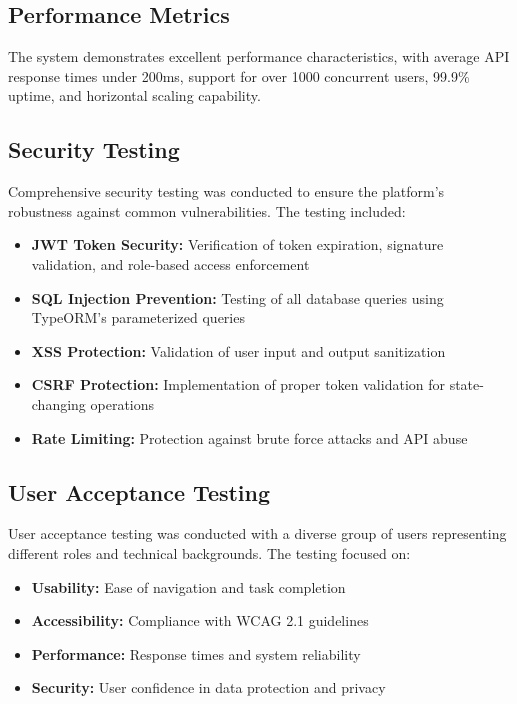 \documentclass[conference]{IEEEtran}
\begin{document}
\subsection{Performance Metrics}
The system demonstrates excellent performance characteristics, with average API response times under 200ms, support for over 1000 concurrent users, 99.9\% uptime, and horizontal scaling capability.

\subsection{Security Testing}
Comprehensive security testing was conducted to ensure the platform's robustness against common vulnerabilities. The testing included:

\begin{itemize}
    \item \textbf{JWT Token Security:} Verification of token expiration, signature validation, and role-based access enforcement
    \item \textbf{SQL Injection Prevention:} Testing of all database queries using TypeORM's parameterized queries
    \item \textbf{XSS Protection:} Validation of user input and output sanitization
    \item \textbf{CSRF Protection:} Implementation of proper token validation for state-changing operations
    \item \textbf{Rate Limiting:} Protection against brute force attacks and API abuse
\end{itemize}

\subsection{User Acceptance Testing}
User acceptance testing was conducted with a diverse group of users representing different roles and technical backgrounds. The testing focused on:

\begin{itemize}
    \item \textbf{Usability:} Ease of navigation and task completion
    \item \textbf{Accessibility:} Compliance with WCAG 2.1 guidelines
    \item \textbf{Performance:} Response times and system reliability
    \item \textbf{Security:} User confidence in data protection and privacy
\end{itemize}
\end{document}
